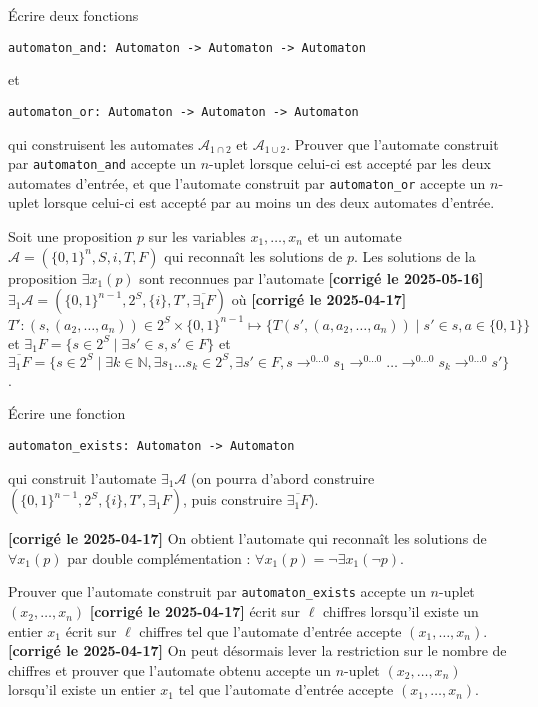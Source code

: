 \documentclass{article}
\begin{document}
Écrire deux fonctions
\begin{verbatim}
automaton_and: Automaton -> Automaton -> Automaton
\end{verbatim}
et
\begin{verbatim}
automaton_or: Automaton -> Automaton -> Automaton
\end{verbatim}
qui construisent les automates \(\mathcal A_{1 \cap 2}\) et \(\mathcal A_{1 \cup 2}\). Prouver que l'automate construit par \texttt{automaton_and} accepte un \(n\)-uplet lorsque celui-ci est accepté par les deux automates d'entrée, et que l'automate construit par \texttt{automaton_or}
accepte un \(n\)-uplet lorsque celui-ci est accepté par au moins un des deux automates d'entrée.

Soit une proposition \(p\) sur les variables \(x_1, \dots, x_n\) et un automate \(\mathcal A = (\{0,1\}^n, S, i, T, F)\) qui reconnaît les solutions de \(p\). Les solutions de la proposition \(\exists x_1 (p)\) sont reconnues par l'automate \textbf{[corrigé le 2025-05-16]} \(\exists_1 \mathcal A = (\{0,1\}^{n-1}, 2^S, \{i\}, T', \overline {\exists_1F})\) où \textbf{[corrigé le 2025-04-17]} \(T' : (s, (a_2, \dots, a_n)) \in 2^S \times \{0,1\}^{n-1} \mapsto \{T(s', (a, a_2, \dots, a_n)) \mid s' \in s, a \in \{0, 1\}\}\)
et \(\exists_1F = \{s \in 2^S \mid \exists s' \in s, s' \in F\}\)
et \(\overline{\exists_1F} = \{s \in 2^S \mid \exists k \in \mathbb N, \exists s_1 \dots s_k \in 2^S, \exists s' \in F, s \rightarrow^{0 \dots 0} s_1  \rightarrow^{0 \dots 0} \dots  \rightarrow^{0 \dots 0} s_k \rightarrow^{0 \dots 0} s' \}\).

Écrire une fonction
\begin{verbatim}
automaton_exists: Automaton -> Automaton
\end{verbatim}
qui construit l'automate \(\exists_1 \mathcal A\) (on pourra d'abord construire \((\{0,1\}^{n-1}, 2^S, \{i\}, T', \exists_1F)\), puis construire \(\overline{\exists_1F}\)).

\textbf{[corrigé le 2025-04-17]} On obtient l'automate qui reconnaît les solutions de \(\forall x_1 (p)\) par double complémentation : \(\forall x_1 (p) = \neg \exists x_1(\neg p)\).

Prouver que l'automate construit par \texttt{automaton_exists} accepte un \(n\)-uplet \((x_2, \dots, x_n)\) \textbf{[corrigé le 2025-04-17]} écrit sur \(\ell\) chiffres
lorsqu'il existe un entier \(x_1\) écrit sur \(\ell\) chiffres tel que l'automate d'entrée accepte \((x_1, \dots, x_n)\). \textbf{[corrigé le 2025-04-17]} On peut désormais lever la restriction sur le nombre de chiffres et prouver que l'automate obtenu accepte un \(n\)-uplet \((x_2, \dots, x_n)\)
lorsqu'il existe un entier \(x_1\) tel que l'automate d'entrée accepte \((x_1, \dots, x_n)\).
\end{document}

